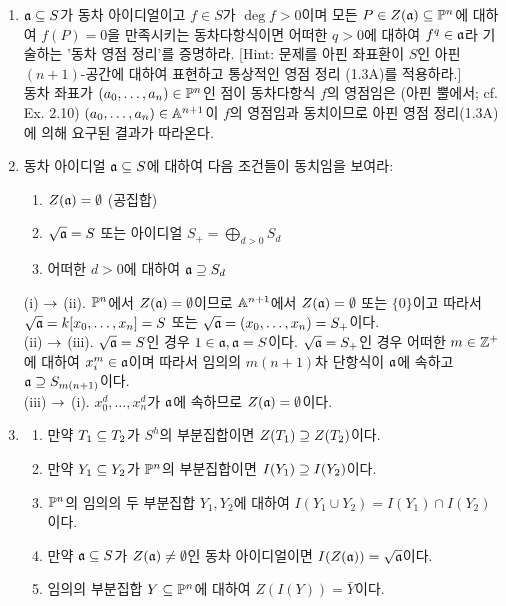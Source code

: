 	
	\begin{enumerate}[label=\tb{2.\arabic*.},itemindent=0mm,itemsep=4mm]
		\item $\mf a\bseq S$가 동차 아이디얼이고 $f\in S$가 $\deg f>0$이며
		모든 $P\in Z(\mf a)\bseq\Pn$에 대하여 $f(P)=0$을 만족시키는 동차다항식이면
		어떠한 $q>0$에 대하여 $f^q\in\mf a$라 기술하는 '동차 영점 정리'를 증명하라.
		[Hint: 문제를 아핀 좌표환이 $S$인 아핀 $(n+1)$-공간에 대하여 표현하고 통상적인 영점 정리 (1.3A)를 적용하라.]\\
		\sol 동차 좌표가 $(a_0,\ldots,a_n)\in\Pn$인 점이 동차다항식 $f$의 영점임은
		(아핀 뿔에서; cf. Ex. 2.10) $(a_0,\ldots,a_n)\in\mb A^{n+1}$이 $f$의 영점임과 동치이므로
		아핀 영점 정리(1.3A)에 의해 요구된 결과가 따라온다.
		\item 동차 아이디얼 $\mf a\bseq S$에 대하여 다음 조건들이 동치임을 보여라:
		\begin{enumerate}[label=(\roman*)]
			\item $Z(\mf a)=\es$ (공집합)
			\item $\sqrt{\mf a}=S$ 또는 아이디얼 $S_+=\bigoplus_{d>0}S_d$
			\item 어떠한 $d>0$에 대하여 $\mf a\pseq S_d$
		\end{enumerate}
		\sol (i) $\ra$ (ii). $\Pn$에서 $Z(\mf a)=\es$이므로 $\mb A^{n+1}$에서 $Z(\mf a)=\es$ 또는 $\{0\}$이고
		따라서 $\sqrt{\mf a}=k[x_0,\ldots,x_n]=S$ 또는 $\sqrt{\mf a}=(x_0,\ldots,x_n)=S_+$이다.\\
		(ii) $\ra$ (iii). $\sqrt{\mf a}=S$인 경우 $1\in\mf a,\mf a=S$이다. $\sqrt{\mf a}=S_+$인 경우 어떠한 $m\in\Z^+$에 대하여
		$x_i^m\in\mf a$이며 따라서 임의의 $m(n+1)$차 단항식이 $\mf a$에 속하고 $\mf a\pseq S_{m(n+1)}$이다.\\
		(iii) $\ra$ (i). $x_0^d,\ldots,x_n^d$가 $\mf a$에 속하므로 $Z(\mf a)=\es$이다.
		\item \begin{enumerate}[label=(\alph*)]
			\item 만약 $T_1\bseq T_2$가 $S^h$의 부분집합이면 $Z(T_1)\pseq Z(T_2)$이다.
			\item 만약 $Y_1\bseq Y_2$가 $\P^n$의 부분집합이면 $I(Y_1)\pseq I(Y_2)$이다.
			\item $\Pn$의 임의의 두 부분집합 $Y_1,Y_2$에 대하여 $I(Y_1\cup Y_2)=I(Y_1)\cap I(Y_2)$이다.
			\item 만약 $\mf a\bseq S$가 $Z(\mf a)\ne\es$인 동차 아이디얼이면 $I(Z(\mf a))=\sqrt{\mf a}$이다.
			\item 임의의 부분집합 $Y\bseq\Pn$에 대하여 $Z(I(Y))=\bar Y$이다.
		\end{enumerate}

\end{enumerate}
